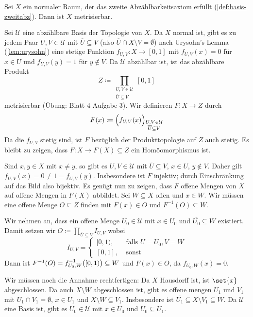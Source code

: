 \begin{satz}[{name={Urysohn}}]
	Sei $X$ ein normaler Raum, der das zweite Abzählbarkeitsaxiom erfüllt (\ref{def:basis-zweitabz}). 
	Dann ist $X$ metrisierbar.
\end{satz}
\begin{beweis}[{name={mit Urysohn's Lemma, \ref{lem:urysohn}}}]
	Sei $\mathcal{U}$ eine abzählbare Basis der Topologie von $X$. 
	Da $X$ normal ist, gibt es zu jedem Paar $U,V \in \mathcal{U}$ mit $\overline{U} \subseteq V $ (also $\overline{U} \cap X \setminus V = \emptyset $) nach Urysohn's Lemma (\ref{lem:urysohn}) eine stetige Funktion $f_{U,V} \colon X \to [0,1]$ mit $f_{U,V} (x) = 0$ für $x \in \overline{U}$ und
	$f_{U,V}(y) = 1$ für $y \notin V$. 
	Da $\mathcal{U}$ abzählbar ist, ist das abzählbare Produkt 
	\[
		Z \coloneqq \prod_{\substack{U,V \in \mathcal{U} \\ \overline{U} \subseteq V}} [0,1]
	\]
	metrisierbar (Übung: Blatt 4 Aufgabe 3).
	Wir definieren $F\colon X \to Z$ durch
	\[
		F(x) \coloneqq \enbrace[\Big]{f_{U,V}(x)}_{\substack{U,V \in \mathcal{U} \\ \overline{U} \subseteq V}} 
	\]
	Da die $f_{U,V}$ stetig sind, ist $F$ bezüglich der Produkttopologie auf $Z$ auch stetig. 
	Es bleibt zu zeigen, dass $F \colon X \to F(X) \subseteq Z$ ein Homöomorphismus ist.
	
	Sind $x,y \in X$ mit $x \neq y$, so gibt es $U,V \in \mathcal{U}$ mit $\overline{U} \subseteq V$, $x \in U$, $y \notin V$. 
	Daher gilt $f_{U,V} (x) = 0 \neq 1 = f_{U,V}(y)$.
	Insbesondere ist $F$ injektiv; durch Einschränkung auf das Bild also bijektiv. 
	Es genügt nun zu zeigen, dass $F$ offene Mengen von $X$ auf offene Mengen in $F(X)$ abbildet.
	Sei $W \subseteq X$ offen und $x \in W$. 
	Wir müssen eine offene Menge $O \subseteq Z$ finden mit $F(x) \in O$ und $F ^{-1}(O) \subseteq W$. 
	
	Wir nehmen an, dass ein offene Menge $U_0 \in \mathcal{U}$ mit $x \in U_0$ und $ \overline{U_0} \subseteq W$ existiert.
	Damit setzen wir $O \coloneqq \prod_{\overline{U} \subseteq V} I_{U,V}$ wobei 
	\[
		I_{U,V} = \begin{cases}
			[0,1), &\text{ falls }U=U_0, V=W\\
			[0,1], &\text{ sonst}
		\end{cases}
	\]
	Dann ist $F ^{-1}(O) = f ^{-1}_{U_0, W} \enbrace[\big]{[0,1)} \subseteq W$ und $F(x) \in O$, da $f_{U_0, W} (x) = 0$.
	
	Wir müssen noch die Annahme rechtfertigen:
	Da $X$ Hausdorff ist, ist $\set{x}$ abgeschlossen. Da auch $X \setminus W$ abgeschlossen ist, gibt es offene mengen $U_1$ und $V_1$ mit $U_1 \cap V_1 = \emptyset$, $x \in U_1$ und
	$X \setminus W \subseteq V_1$. Insbesondere ist $\overline{U_1} \subseteq X \setminus V_1 \subseteq W $. Da $\mathcal{U}$ eine Basis ist, gibt es $U_0 \in \mathcal{U}$ mit 
	$x \in U_0$ und $U_0 \subseteq U_1$.
\end{beweis}

